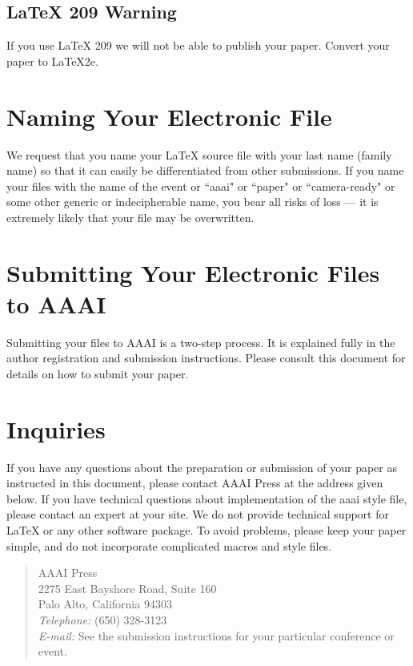 \documentclass[letterpaper]{article}
\begin{document}
\subsection{\LaTeX{} 209 Warning}
If you use \LaTeX{} 209 we will not be able to publish your paper. Convert your paper to \LaTeX{}2e.

\section{Naming Your Electronic File}
We request that you name your \LaTeX{} source file with your last name (family name) so that it can easily be differentiated from other submissions. If you name your files with the name of the event or ``aaai" or ``paper" or ``camera-ready" or some other generic or indecipherable name, you bear all risks of loss --- it is extremely likely that your file may be overwritten.

\section{Submitting Your Electronic Files to AAAI}
Submitting your files to AAAI is a two-step process. It is explained fully in the author registration and submission instructions. Please consult this document for details on how to submit your paper.

\section{Inquiries} 
If you have any questions about the preparation or submission of your paper as instructed in this document, please contact AAAI Press at the address given below. If you have technical questions about implementation of the aaai style file, please contact an expert at your site. We do not provide technical support for \LaTeX{} or any other software package. To avoid problems, please keep your paper simple, and do not incorporate complicated macros and style files.

\begin{quote}
\noindent AAAI Press\\
2275 East Bayshore Road, Suite 160\\
Palo Alto, California 94303\\ 
\textit{Telephone:} (650) 328-3123\\ 
\textit{E-mail:} See the submission instructions for your particular conference or event.
\end{quote}
\end{document}
